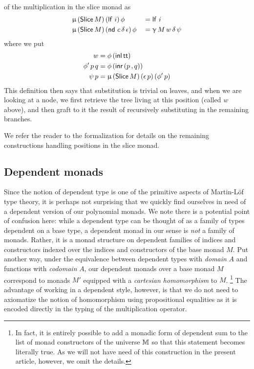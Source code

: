 of the multiplication in the slice monad as
\begin{align*}
  &\upmu\, (\mathsf{Slice}\, M)\, (\mathsf{lf}\,\, i)\, \phi &&= \mathsf{lf}\,\, i \\
  &\upmu\, (\mathsf{Slice}\, M)\, (\mathsf{nd}\,\, c\, \delta\, \epsilon)\, \phi &&= \upgamma\, M\, w\, \delta\, \psi
\end{align*}
where we put
\begin{align*}
  w &= \phi\, (\mathsf{inl}\, \mathsf{tt}) \\
  \phi'\, p \, q &= \phi\, (\mathsf{inr}\, (p \,, q)) \\
  \psi\, p &= \upmu\, (\mathsf{Slice}\, M)\, (\epsilon\, p)\, (\phi'\, p)
\end{align*}
This definition then says that substitution is trivial on leaves, and
when we are looking at a node, we first retrieve the tree living at
this position (called $w$ above), and then graft to it the result of
recursively substituting in the remaining branches.

We refer the reader to the formalization for details on the remaining
constructions handling positions in the slice monad.\\

%

\subsection{Dependent monads}

Since the notion of dependent type is one of the primitive aspects of
Martin-L\"{o}f type theory, it is perhaps not surprising that we
quickly find ourselves in need of a dependent version of our
polynomial monads.  We note there is a potential point of confusion
here: while a dependent type can be thought of as a family of types
dependent on a base type, a dependent monad in our sense is \emph{not}
a family of monads.  Rather, it is a monad structure on dependent
families of indices and constructors indexed over the indices and
constructors of the base monad $M$.  Put another way, under the
equivalence between dependent types with \emph{domain} $A$ and
functions with \emph{codomain} $A$, our dependent monads over a base
monad $M$ correspond to monads $M'$ equipped with a \emph{cartesian
  homomorphism} to $M$. \footnote{In fact, it is entirely possible to
  add a monadic form of dependent sum to the list of monad
  constructors of the universe $\mathbb{M}$ so that this statement becomes
  literally true.  As we will not have need of this construction in
  the present article, however, we omit the details.}  The advantage
of working in a dependent style, however, is that we do not need to
axiomatize the notion of homomorphism using propositional equalities
as it is encoded directly in the typing of the multiplication
operator.

